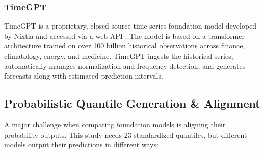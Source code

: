 \subsubsection{TimeGPT}
TimeGPT is a proprietary, closed-source time series foundation model developed by Nixtla and accessed via a web API \cite{timegpt}. The model is based on a transformer architecture trained on over 100 billion historical observations across finance, climatology, energy, and medicine. TimeGPT ingests the historical series, automatically manages normalization and frequency detection, and generates forecasts along with estimated prediction intervals.

\subsection{Probabilistic Quantile Generation \& Alignment}
A major challenge when comparing foundation models is aligning their probability outputs. This study needs 23 standardized quantiles, but different models output their predictions in different ways:
